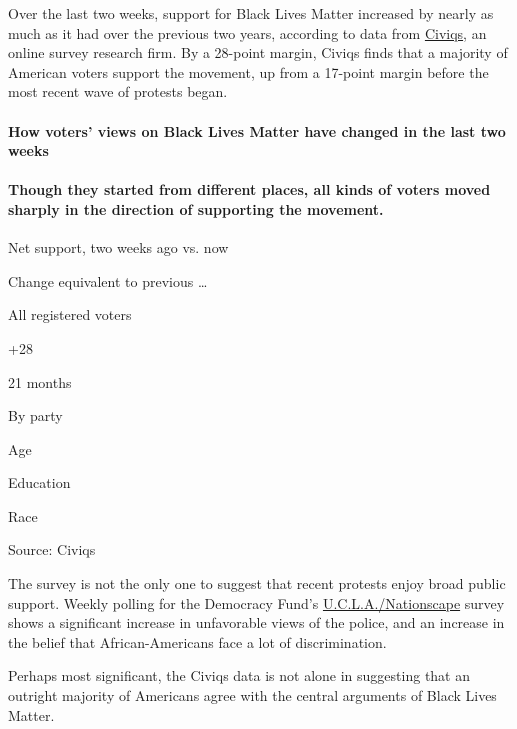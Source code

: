 Over the last two weeks, support for Black Lives Matter increased by
nearly as much as it had over the previous two years, according to data
from \href{https://civiqs.com/}{Civiqs}, an online survey research firm.
By a 28-point margin, Civiqs finds that a majority of American voters
support the movement, up from a 17-point margin before the most recent
wave of protests began.

\hypertarget{how-voters-views-on-black-lives-matter-have-changed-in-the-last-two-weeks}{%
\paragraph{How voters' views on Black Lives Matter have changed in the
last two
weeks}\label{how-voters-views-on-black-lives-matter-have-changed-in-the-last-two-weeks}}

\hypertarget{though-they-started-from-different-places-all-kinds-of-voters-moved-sharply-in-the-direction-of-supporting-the-movement}{%
\paragraph{Though they started from different places, all kinds of
voters moved sharply in the direction of supporting the
movement.}\label{though-they-started-from-different-places-all-kinds-of-voters-moved-sharply-in-the-direction-of-supporting-the-movement}}

Net support, two weeks ago vs. now

Change equivalent to previous \ldots{}

All registered voters

+28

21 months

By party

Age

Education

Race

Source: Civiqs

The survey is not the only one to suggest that recent protests enjoy
broad public support. Weekly polling for the Democracy Fund's
\href{https://www.voterstudygroup.org/nationscape}{U.C.L.A./Nationscape}
survey shows a significant increase in unfavorable views of the police,
and an increase in the belief that African-Americans face a lot of
discrimination.

Perhaps most significant, the Civiqs data is not alone in suggesting
that an outright majority of Americans agree with the central arguments
of Black Lives Matter.

